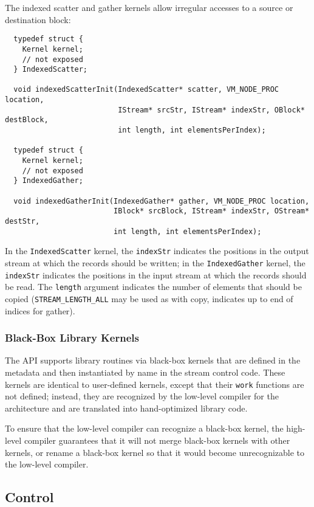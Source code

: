 The indexed scatter and gather kernels allow irregular accesses to a source or destination block: 
{\small \begin{verbatim}
  typedef struct {
    Kernel kernel;
    // not exposed
  } IndexedScatter;

  void indexedScatterInit(IndexedScatter* scatter, VM_NODE_PROC location,
                          IStream* srcStr, IStream* indexStr, OBlock* destBlock, 
                          int length, int elementsPerIndex);
                     
  typedef struct {
    Kernel kernel;
    // not exposed
  } IndexedGather;

  void indexedGatherInit(IndexedGather* gather, VM_NODE_PROC location, 
                         IBlock* srcBlock, IStream* indexStr, OStream* destStr, 
                         int length, int elementsPerIndex);
\end{verbatim}}

In the {\tt IndexedScatter} kernel, the {\tt indexStr} indicates the positions in the output stream at which the records should be written; in the {\tt IndexedGather} kernel, the {\tt indexStr} indicates the positions in the input stream at which the records should be read. The {\tt length} argument indicates the number of elements that should be copied ({\tt STREAM\_LENGTH\_ALL} may be used as with copy, indicates up to end of indices for gather).

\subsubsection{Black-Box Library Kernels}
\label{sec:kernelllc}

The API supports library routines via black-box kernels that are defined in the metadata and then instantiated by name in the stream control code.  These kernels are identical to user-defined kernels, except that their {\tt work} functions are not defined; instead, they are 
recognized by the low-level compiler for the architecture and are 
translated into hand-optimized library code.

To ensure that the low-level compiler can recognize a black-box kernel, the high-level compiler guarantees that it will not merge black-box kernels with other kernels, or rename a black-box kernel so that it would become unrecognizable to the low-level compiler.

\subsection{Control}
\label{sec:control}

